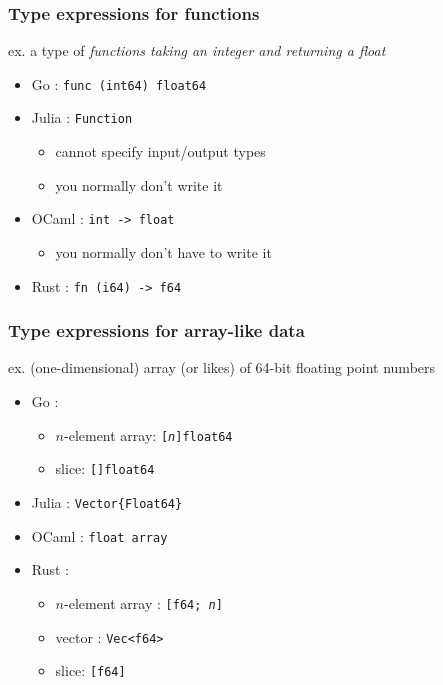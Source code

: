 \documentclass[12pt,dvipdfmx]{beamer}
\newcommand{\ao}[1]{{\color{blue}#1}}
\begin{document}
  
  
\begin{frame}
  \frametitle{Type expressions for functions}
  ex. a type of \ao{\it functions taking an integer and returning a float}
  \begin{itemize}
  \item Go : \ao{\tt func (int64) float64}
  \item Julia : \ao{\tt Function}
    \begin{itemize}
    \item cannot specify input/output types
    \item you normally don't write it
    \end{itemize}
  \item OCaml : \ao{\tt int -> float}
    \begin{itemize}
    \item you normally don't have to write it
    \end{itemize}
  \item Rust : \ao{\tt fn (i64) -> f64}
  \end{itemize}
\end{frame}

\begin{frame}[fragile]
  \frametitle{Type expressions for array-like data}
  ex. (one-dimensional) array (or likes) of 64-bit floating point numbers
  \begin{itemize}
  \item Go :
    \begin{itemize}
    \item $n$-element array: \ao{\tt [{\it n}]float64} 
    \item slice: \ao{\tt []float64} 
    \end{itemize}
  \item Julia : \ao{\tt Vector\{Float64\}}
  \item OCaml : \ao{\tt float array}
  \item Rust :
    \begin{itemize}
    \item $n$-element array : \ao{\tt [f64; {\it n}]} 
    \item vector : \ao{\tt Vec<f64>}
    \item slice: \ao{\tt [f64]} 
    \end{itemize}
  \end{itemize}
\end{frame}
\end{document}
